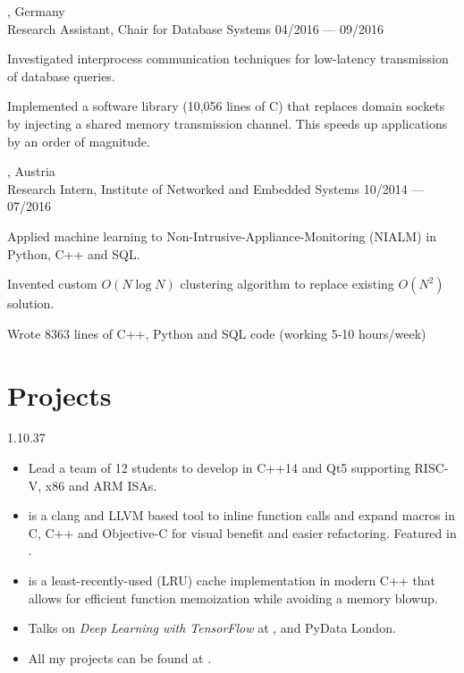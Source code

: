 \begin{entry}
  {, Germany}
	{\\Research Assistant, Chair for Database Systems}
	{04/2016 --- 09/2016}

  \item Investigated interprocess communication techniques for low-latency transmission of database queries.
  \item Implemented a software library (10,056 lines of C) that replaces domain sockets by injecting a shared memory transmission channel. This speeds up applications by an order of magnitude.
\end{entry}

\begin{entry}
  {, Austria}
	{\\Research Intern, Institute of Networked and Embedded Systems}
	{10/2014 --- 07/2016}

  \item Applied machine learning to Non-Intrusive-Appliance-Monitoring (NIALM) in Python, C++ and SQL.
	\item Invented custom $O(N \log N)$ clustering algorithm to replace existing $O(N^2)$ solution.
	\item Wrote 8363 lines of C++, Python and SQL code (working 5-10 hours/week)
\end{entry}
\vspace{-1mm}

\section{Projects}{1.1}{0.37}
\vspace{-4mm}
\begin{itemize}
  \item Lead a team of 12 students to develop  in C++14 and Qt5 supporting RISC-V, x86 and ARM ISAs.
  \item {} is a clang and LLVM based tool to inline function calls and expand macros in C, C++ and Objective-C for visual benefit and easier refactoring. Featured in .
  \item {} is a least-recently-used (LRU) cache implementation in modern C++ that allows for efficient function memoization while avoiding a memory blowup.
  \item Talks on \emph{Deep Learning with TensorFlow} at ,  and PyData London.
  \item All my projects can be found at
	.
\end{itemize}

